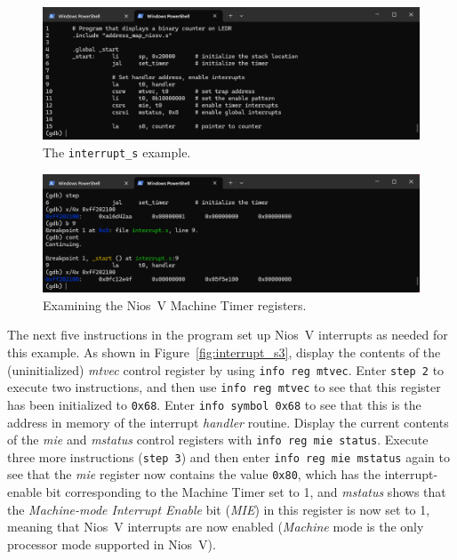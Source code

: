 \documentclass[11pt, twoside, pdftex]{article}
\begin{document}
\begin{figure}[h]
    \begin{center}
        \includegraphics[scale=.6]{figures/interrupt_s1.png}
        \caption{The \texttt{interrupt\_s} example.}
        \label{fig:interrupt_s1}
    \end{center}
\end{figure}

\begin{figure}[h]
    \begin{center}
        \includegraphics[scale=.6]{figures/interrupt_s2.png}
        \caption{Examining the Nios~V Machine Timer registers.}
        \label{fig:interrupt_s2}
    \end{center}
\end{figure}

The next five instructions in the program set up Nios~V interrupts as needed for this
example. As shown in Figure~\ref{fig:interrupt_s3}, display
the contents of the (uninitialized) {\it mtvec} control register by using
\texttt{info reg mtvec}. Enter \texttt{step 2} to execute two instructions, and
then use \texttt{info reg mtvec} to see that this register has been initialized to
\texttt{0x68}. Enter \texttt{info symbol 0x68} to see that this is the address in memory of the 
interrupt {\it handler} routine. 
Display the current contents of the {\it mie} and {\it mstatus} control registers
with \texttt{info reg mie status}. Execute three more instructions (\texttt{step 3}) and
then enter \texttt{info reg mie mstatus} again to see that the {\it mie} register now
contains the value \texttt{0x80}, which has the interrupt-enable bit corresponding to the
Machine Timer set to 1, and {\it mstatus} shows that the {\it Machine-mode Interrupt Enable} bit
({\it MIE}) in this register is now set to 1, meaning that Nios~V interrupts are now
enabled ({\it Machine} mode is the only processor mode supported in Nios~V).
\end{document}
